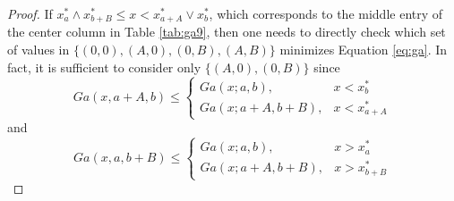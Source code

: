 \documentclass[11pt]{article}
\begin{document}
\begin{proof}
		If $x_a^* \wedge x_{b+B}^*\le x < x_{a+A}^* \vee x_{b}^*$, which corresponds to the middle entry of the center column in Table \ref{tab:ga9}, then one needs to directly check which set of values in $\{(0,0), (A, 0), (0, B), (A,B)\}$ minimizes Equation \ref{eq:ga}. In fact, it is sufficient to consider only $\{(A,0), (0, B)\}$ since
		$$Ga(x, a+A, b) \le \begin{cases}
			Ga(x;a,b), & x < x_b^* \\
			Ga(x;a+A,b+B), & x < x_{a+A}^* 
		\end{cases}$$
		and
		$$Ga(x, a, b+B) \le \begin{cases}
			Ga(x;a,b), & x > x_a^* \\
			Ga(x;a+A,b+B), & x > x_{b+B}^* 
		\end{cases}$$
	\end{proof}
	
	
	\begin{figure}	

	\end{figure}
	
\end{document}
